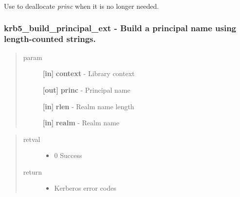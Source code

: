 \documentclass[letterpaper,10pt,english]{sphinxmanual}
\begin{document}
Use {\hyperref[appdev/refs/api/krb5_free_principal:krb5_free_principal]{}} to deallocate \emph{princ} when it is no longer needed.


\subsubsection{krb5\_build\_principal\_ext -  Build a principal name using length-counted strings.}
\label{appdev/refs/api/krb5_build_principal_ext:krb5-build-principal-ext-build-a-principal-name-using-length-counted-strings}\label{appdev/refs/api/krb5_build_principal_ext::doc}

\begin{fulllineitems}
\label{appdev/refs/api/krb5_build_principal_ext:krb5_build_principal_ext}
\end{fulllineitems}

\begin{quote}\begin{description}
\item[{param}] \leavevmode
\textbf{{[}in{]}} \textbf{context} - Library context

\textbf{{[}out{]}} \textbf{princ} - Principal name

\textbf{{[}in{]}} \textbf{rlen} - Realm name length

\textbf{{[}in{]}} \textbf{realm} - Realm name

\end{description}\end{quote}
\begin{quote}\begin{description}
\item[{retval}] \leavevmode\begin{itemize}
\item {} 
0   Success

\end{itemize}

\item[{return}] \leavevmode\begin{itemize}
\item {} 
Kerberos error codes

\end{itemize}

\end{description}\end{quote}
\end{document}

